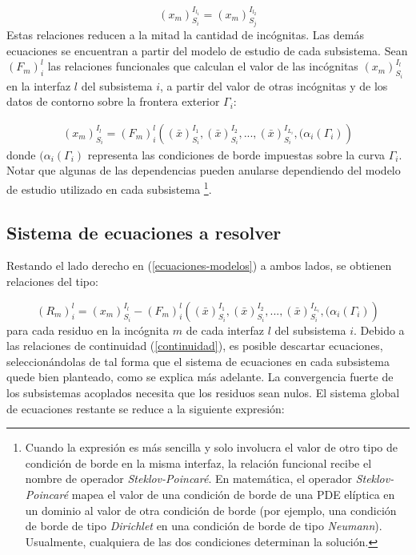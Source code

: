 \begin{equation}
{(x_m)_{S_i}^{I_{l_1}}}={(x_m)_{S_j}^{I_{l_2}}}
\label{continuidad}
\end{equation}
Estas relaciones reducen a la mitad la cantidad de incógnitas.
Las demás ecuaciones se encuentran a partir del modelo de estudio de cada subsistema. 
Sean $(F_m)_{i}^{l}$ las relaciones funcionales que calculan el valor de las incógnitas ${(x_m)_{S_i}^{I_l}}$ en la interfaz $l$ del subsistema $i$,
a partir del valor de otras incógnitas y de los datos de contorno sobre la frontera exterior $\Gamma_i$:

\begin{equation}
\begin{split}
  (x_m)_{S_i}^{I_l} = (F_m)_{i}^{l} \left ( (\bar{x})_{S_i}^{I_1}, (\bar{x})_{S_i}^{I_2}, ..., 
  (\bar{x})_{S_i}^{I_{L_i}}, (\alpha_i({\Gamma_i}) \right )
\end{split}
\label{ecuaciones-modelos}
\end{equation}
donde $(\alpha_i({\Gamma_i})$ representa las condiciones de borde impuestas sobre la curva $\Gamma_i$.
Notar que algunas de las dependencias pueden anularse dependiendo del modelo de estudio utilizado en cada subsistema
\footnote{
Cuando la expresión es más sencilla y solo involucra el valor de otro tipo de condición de borde en la misma interfaz,
la relación funcional recibe el nombre de operador \textit{Steklov-Poincaré}.
En matemática, el operador \textit{Steklov-Poincaré} mapea el valor de una condición de borde de una PDE elíptica en un dominio al valor
de otra condición de borde (por ejemplo, una condición de borde de tipo \textit{Dirichlet} en una condición de borde de tipo \textit{Neumann}).
Usualmente, cualquiera de las dos condiciones determinan la solución.
}.

\subsection{Sistema de ecuaciones a resolver}
\label{1:ecuaciones}
Restando el lado derecho en (\ref{ecuaciones-modelos}) a ambos lados, se obtienen relaciones del tipo:

\begin{equation}
(R_m)_{i}^{l} =   (x_m)_{S_i}^{I_l} - (F_m)_{i}^{l} \left ( (\bar{x})_{S_i}^{I_1}, (\bar{x})_{S_i}^{I_2}, ..., 
  (\bar{x})_{S_i}^{I_{L_i}}, (\alpha_i({\Gamma_i}) \right ) 
\end{equation}
para cada residuo en la incógnita $m$ de cada interfaz $l$ del subsistema $i$.
Debido a las relaciones de continuidad (\ref{continuidad}), es posible descartar ecuaciones,
seleccionándolas de tal forma que el sistema de ecuaciones en cada subsistema quede bien planteado,
como se explica más adelante.
La convergencia fuerte de los subsistemas acoplados necesita que los residuos sean nulos.
El sistema global de ecuaciones restante se reduce a la siguiente expresión:

